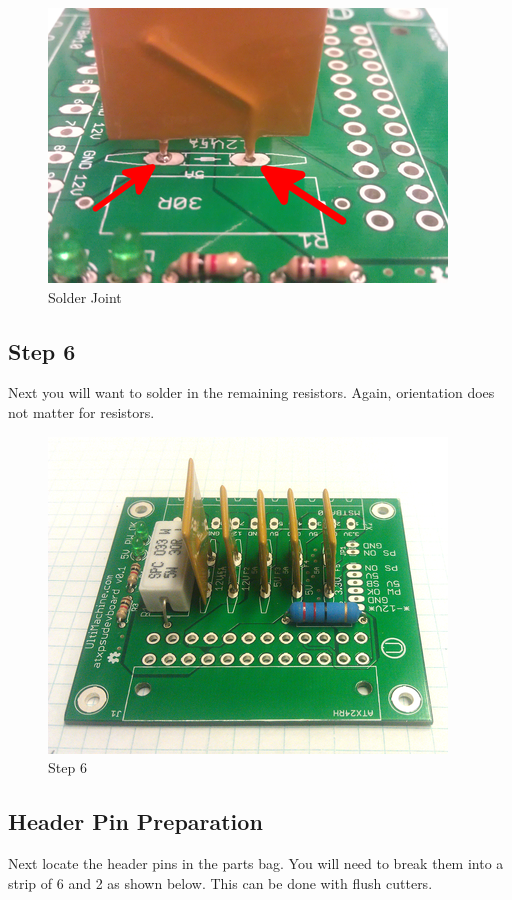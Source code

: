 \begin{figure}[H]
\centering
\includegraphics{./png/solder-joint.png}
\caption{Solder Joint}
\end{figure}

\subsection{Step 6}

Next you will want to solder in the remaining resistors. Again,
orientation does not matter for resistors.

\begin{figure}[H]
\centering
\includegraphics{./png/step-06.png}
\caption{Step 6}
\end{figure}

\subsection{Header Pin Preparation}

Next locate the header pins in the parts bag. You will need to break
them into a strip of 6 and 2 as shown below. This can be done with flush
cutters.

